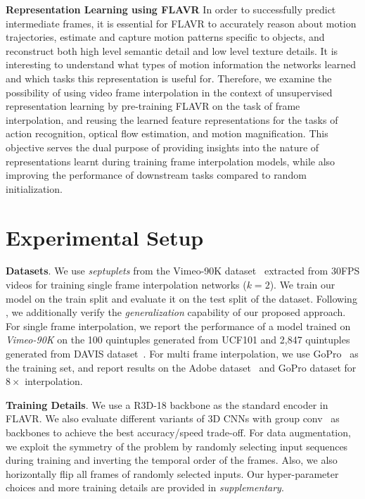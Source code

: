 \documentclass[10pt,twocolumn,letterpaper]{article}
\newcommand{\Ours}{FLAVR}
\newcommand{\eightx}{$8\times$}
\begin{document}
{\bf Representation Learning using \Ours{}} In order to successfully predict intermediate frames, it is essential for \Ours{} to accurately reason about motion trajectories, estimate and capture motion patterns specific to objects, and reconstruct both high level semantic detail and low level texture details. It is interesting to understand what types of motion information the networks learned and which tasks this representation is useful for. Therefore, we examine the possibility of using video frame interpolation in the context of unsupervised representation learning by pre-training \Ours{} on the task of frame interpolation, and reusing the learned feature representations for the tasks of action recognition, optical flow estimation, and motion magnification. This objective serves the dual purpose of providing insights into the nature of representations learnt during training frame interpolation models, while also improving the performance of downstream tasks compared to random initialization.


\section{Experimental Setup}

{\bf Datasets}. 
We use \textit{septuplets} from the Vimeo-90K dataset~\cite{xue2019video} extracted from 30FPS videos for training single frame interpolation networks ($k{=}2$). We train our model on the train split and evaluate it on the test split of the dataset. Following \cite{xu2019quadratic}, we additionally verify the \textit{generalization} capability of our proposed approach. For single frame interpolation, we report the performance of a model trained on \textit{Vimeo-90K} on the 100 quintuples generated from UCF101\cite{UCF101} and 2,847 quintuples generated from DAVIS dataset~\cite{perazzi2016benchmark}. For multi frame interpolation, we use GoPro~\cite{nah2017deep} as the training set, and report results on the Adobe dataset~\cite{su2017deep} and GoPro dataset\cite{nah2017deep} for \eightx{} interpolation. 


{\bf Training Details}. 
We use a R3D-18 backbone as the standard encoder in \Ours{}. We also evaluate different variants of 3D CNNs with group conv~\cite{Tran19} as backbones to achieve the best accuracy/speed trade-off. 
For data augmentation, we exploit the symmetry of the problem by randomly selecting input sequences during training and inverting the temporal order of the frames. Also, we also horizontally flip all frames of randomly selected inputs. Our hyper-parameter choices and more training details are provided in \emph{supplementary}.
\end{document}
